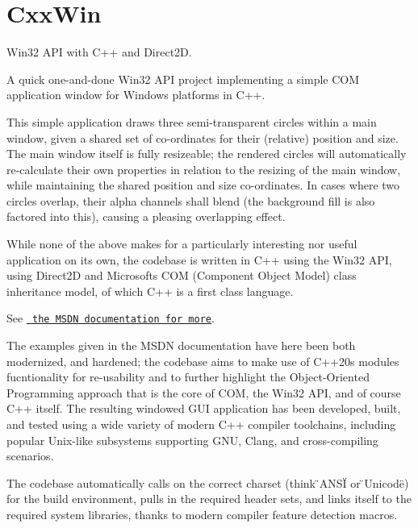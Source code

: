 \chapter{Cxx\+Win}
\hypertarget{index}{}\label{index}
\label{index_md__r_e_a_d_m_e}%
%
 Win32 API with C++ and Direct2D.

A quick one-\/and-\/done Win32 API project implementing a simple COM application window for Windows platforms in C++.



This simple application draws three semi-\/transparent circles within a main window, given a shared set of co-\/ordinates for their (relative) position and size. The main window itself is fully resizeable; the rendered circles will automatically re-\/calculate their own properties in relation to the resizing of the main window, while maintaining the shared position and size co-\/ordinates. In cases where two circles overlap, their alpha channels shall blend (the background fill is also factored into this), causing a pleasing overlapping effect.

While none of the above makes for a particularly interesting nor useful application on it\textquotesingle{}s own, the codebase is written in C++ using the Win32 API, using Direct2D and Microsoft\textquotesingle{}s COM (Component Object Model) class inheritance model, of which C++ is a first class language.

See \href{https://learn.microsoft.com/en-us/windows/win32/learnwin32/introduction-to-windows-programming-in-c--}{\texttt{ the MSDN documentation for more}}.

The examples given in the MSDN documentation have here been both modernized, and hardened; the codebase aims to make use of C++20\textquotesingle{}s \textquotesingle{}modules\textquotesingle{} fucntionality for re-\/usability and to further highlight the Object-\/\+Oriented Programming approach that is the core of COM, the Win32 API, and of course C++ itself. The resulting windowed GUI application has been developed, built, and tested using a wide variety of modern C++ compiler toolchains, including popular Unix-\/like subsystems supporting GNU, Clang, and cross-\/compiling scenarios.

The codebase automatically calls on the correct charset (think \"{}\+ANSI\"{} or \"{}\+Unicode\"{}) for the build environment, pulls in the required header sets, and links itself to the required system libraries, thanks to modern compiler feature detection macros.

